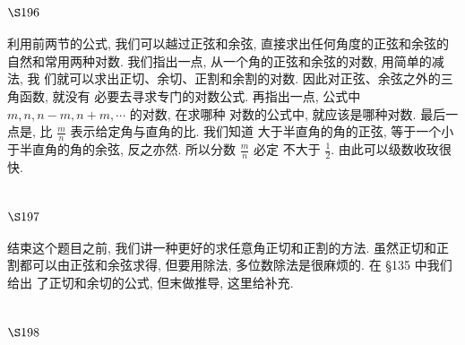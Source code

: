\section{$\S 196$}

利用前两节的公式, 我们可以越过正弦和余弦, 直接求出任何角度的正弦和余弦的 自然和常用两种对数. 我们指出一点, 从一个角的正弦和余弦的对数, 用简单的减法, 我 们就可以求出正切、余切、正割和余割的对数. 因此对正弦、余弦之外的三角函数, 就没有 必要去寻求专门的对数公式. 再指出一点, 公式中 $m, n, n-m, n+m, \cdots$ 的对数, 在求哪种 对数的公式中, 就应该是哪种对数. 最后一点是, 比 $\frac{m}{n}$ 表示给定角与直角的比. 我们知道 大于半直角的角的正弦, 等于一个小于半直角的角的余弦, 反之亦然. 所以分数 $\frac{m}{n}$ 必定 不大于 $\frac{1}{2}$. 由此可以级数收玫很快.

\section{$\S 197$}

结束这个题目之前, 我们讲一种更好的求任意角正切和正割的方法. 虽然正切和正 割都可以由正弦和余弦求得, 但要用除法, 多位数除法是很麻烦的. 在 §135 中我们给出 了正切和余切的公式, 但末做推导, 这里给补充.

\section{$\S 198$}

